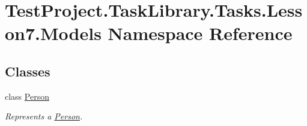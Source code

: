 \hypertarget{namespace_test_project_1_1_task_library_1_1_tasks_1_1_lesson7_1_1_models}{}\section{Test\+Project.\+Task\+Library.\+Tasks.\+Lesson7.\+Models Namespace Reference}
\label{namespace_test_project_1_1_task_library_1_1_tasks_1_1_lesson7_1_1_models}
\subsection*{Classes}
\begin{DoxyCompactItemize}
\item 
class \mbox{\hyperlink{class_test_project_1_1_task_library_1_1_tasks_1_1_lesson7_1_1_models_1_1_person}{Person}}
\begin{DoxyCompactList}\small\item\em Represents a \mbox{\hyperlink{class_test_project_1_1_task_library_1_1_tasks_1_1_lesson7_1_1_models_1_1_person}{Person}}. \end{DoxyCompactList}\end{DoxyCompactItemize}

